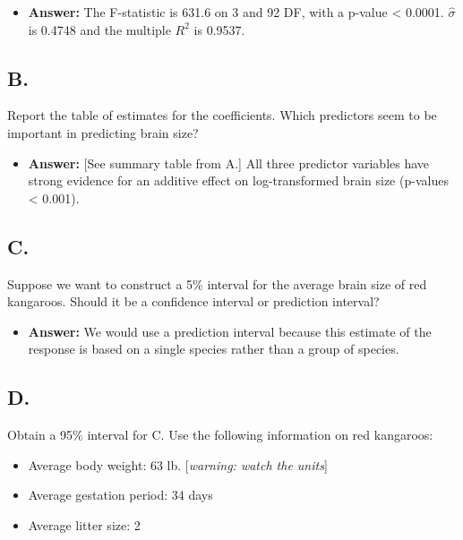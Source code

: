 \documentclass[]{article}
\providecommand{\tightlist}{%
  \setlength{\itemsep}{0pt}\setlength{\parskip}{0pt}}
\begin{document}
\begin{itemize}
\tightlist
\item
  \textbf{Answer:} The F-statistic is 631.6 on 3 and 92 DF, with a
  p-value \textless{} 0.0001. \(\hat{\sigma}\) is 0.4748 and the
  multiple \(R^2\) is 0.9537.
\end{itemize}

\subsection{B.}\label{b.-2}

Report the table of estimates for the coefficients. Which predictors
seem to be important in predicting brain size?

\begin{itemize}
\tightlist
\item
  \textbf{Answer:} {[}See summary table from A.{]} All three predictor
  variables have strong evidence for an additive effect on
  log-transformed brain size (p-values \textless{} 0.001).
\end{itemize}

\subsection{C.}\label{c.-2}

Suppose we want to construct a 5\% interval for the average brain size
of red kangaroos. Should it be a confidence interval or prediction
interval?

\begin{itemize}
\tightlist
\item
  \textbf{Answer:} We would use a prediction interval because this
  estimate of the response is based on a single species rather than a
  group of species.
\end{itemize}

\subsection{D.}\label{d.-2}

Obtain a 95\% interval for C. Use the following information on red
kangaroos:

\begin{itemize}
\tightlist
\item
  Average body weight: 63 lb. {[}\emph{warning: watch the units}{]}
\item
  Average gestation period: 34 days
\item
  Average litter size: 2
\end{itemize}
\end{document}
